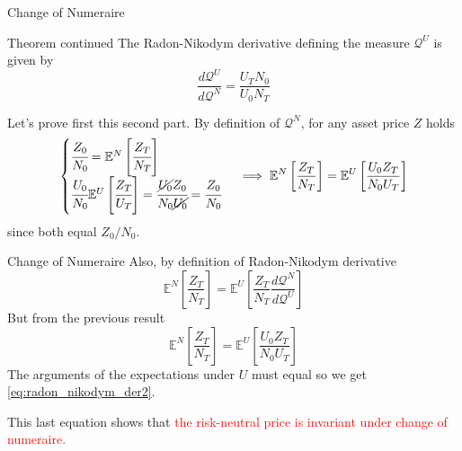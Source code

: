 \documentclass{beamer}
\begin{document}
\begin{frame}{Change of Numeraire}
	\begin{block}{Theorem continued}
		The Radon-Nikodym derivative defining the measure $\mathcal{Q}^U$ is given by
		\begin{equation}
			\frac{d\mathcal{Q}^U}{d\mathcal{Q}^N} = \frac{U_T N_0}{U_0 N_T}
			\label{eq:radon_nikodym_der2}
		\end{equation}
	\end{block}	
	Let's prove first this second part.
	By definition of $\mathcal{Q}^N$, for any asset price $Z$ holds
	\begin{equation*}
		\begin{cases}
		\cfrac{Z_0}{N_0} = 
		\mathbb{E}^N\left[\cfrac{Z_T}{N_T}\right] \\
		\cfrac{U_0}{N_0}\mathbb{E}^U\left[\cfrac{Z_T}{U_T}\right] = \cfrac{\cancel{U_0} Z_0}{N_0 \cancel{U_0}} = \cfrac{Z_0}{N_0}
		\end{cases}\implies \mathbb{E}^N\left[\frac{Z_T}{N_T}\right] = \mathbb{E}^U\left[\frac{U_0 Z_T}{N_0 U_T}\right]
	\end{equation*}
	since both equal $Z_0/N_0$. 
\end{frame}
	
\begin{frame}{Change of Numeraire}
	Also, by definition of Radon-Nikodym derivative
	\begin{equation*}
		\mathbb{E}^N\left[\frac{Z_T}{N_T}\right] = \mathbb{E}^U\left[\frac{Z_T}{N_T} \frac{d\mathcal{Q}^N}{d\mathcal{Q}^U}\right]
	\end{equation*}
	But from the previous result
	\begin{equation*}
	\mathbb{E}^N\left[\frac{Z_T}{N_T}\right] = \mathbb{E}^U\left[\frac{U_0 Z_T}{N_0 U_T}\right]
	\end{equation*}
	The arguments of the expectations under $U$ must equal so we get \cref{eq:radon_nikodym_der2}. 
	
	This last equation shows that \textcolor{red}{the risk-neutral price is invariant under change of numeraire.}
\end{frame}
\end{document}
